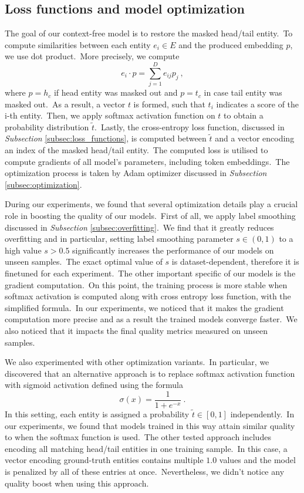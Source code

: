 \documentclass[longabstract, english, mgr]{iithesis}
\theoremstyle{default_theorem_style}\newtheorem{theorem}{Theorem}
\theoremstyle{default_theorem_style}\newtheorem{definition}{Definition}
\begin{document}
\subsection{Loss functions and model optimization}\label{subsec:transformer_loss_functions}

The goal of our context-free model is to restore the masked head/tail entity.\ To compute similarities between
each entity $e_i \in E$ and the produced embedding $p$, we use dot product.\ More precisely, we compute
$$
e_i \cdot p = \sum\limits_{j=1}^{D} e_{ij} p_j\ ,
$$
where $p = h_c$ if head entity was masked out and $p = t_c$ in case tail entity was masked out.\ As a result, a vector
$t$ is formed, such that $t_i$ indicates a score of the i-th entity.\ Then, we apply softmax activation function on
$t$ to obtain a probability distribution $\tilde{t}$.\ Lastly, the cross-entropy loss function, discussed in
\textit{Subsection} \ref{subsec:loss_functions}, is computed between $\tilde{t}$ and a vector encoding an index of
the masked head/tail entity.\ The computed loss is utilised to compute gradients of all model's parameters, including
token embeddings.\ The optimization process is taken by Adam optimizer discussed in \textit{Subsection}
\ref{subsec:optimization}. \newline

\noindent During our experiments, we found that several optimization details play a crucial role in boosting the
quality of our models.\ First of all, we apply label smoothing discussed in
\textit{Subsection} \ref{subsec:overfitting}.\ We find that it greatly reduces overfitting and in particular, setting
label smoothing parameter $s \in (0, 1)$ to a high value $s > 0.5$ significantly increases the performance of our
models on unseen samples.\ The exact optimal value of $s$ is dataset-dependent, therefore it is finetuned for each
experiment.\ The other important specific of our models is the gradient computation.\ On this point, the training
process is more stable when softmax activation is computed along with cross entropy loss function, with the simplified
formula.\ In our experiments, we noticed that it makes the gradient computation more precise and as a result the
trained models converge faster.\ We also noticed that it impacts the final quality metrics measured on unseen
samples.\newline

\noindent We also experimented with other optimization variants.\ In particular, we discovered that an
alternative approach is to replace softmax activation function with sigmoid activation defined using the formula
$$
\sigma(x) = \frac{1}{1 + e^{-x}}\ .
$$
In this setting, each entity is assigned a probability $\tilde{t} \in [0, 1]$ independently.\ In our experiments, we
found that models trained in this way attain similar quality to when the softmax function is used.\ The other tested
approach includes encoding all matching head/tail entities in one training sample.\ In this case, a vector encoding
ground-truth entities contains multiple $1.0$ values and the model is penalized by all of these entries at
once.\ Nevertheless, we didn't notice any quality boost when using this approach.
\end{document}
